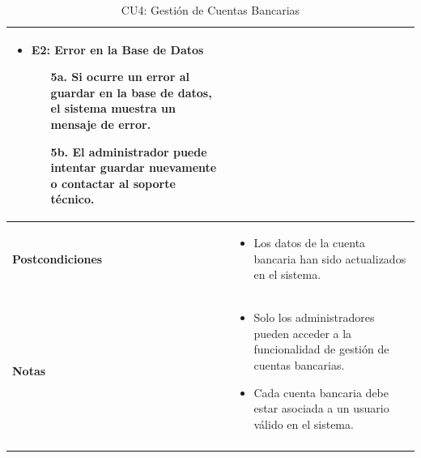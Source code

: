 \documentclass{article}
\begin{document}
\begin{longtable}{|l|p{10cm}|}
\begin{itemize}
    \item \textbf{E2: Error en la Base de Datos}
    \begin{enumerate}
        \item[5a.] Si ocurre un error al guardar en la base de datos, el sistema muestra un mensaje de error.
        \item[5b.] El administrador puede intentar guardar nuevamente o contactar al soporte técnico.
    \end{enumerate}
\end{itemize} \\ \hline
\textbf{Postcondiciones} & 
\begin{itemize}
    \item Los datos de la cuenta bancaria han sido actualizados en el sistema.
\end{itemize} \\ \hline
\textbf{Notas} & 
\begin{itemize}
    \item Solo los administradores pueden acceder a la funcionalidad de gestión de cuentas bancarias.
    \item Cada cuenta bancaria debe estar asociada a un usuario válido en el sistema.
\end{itemize} \\ \hline
\caption{CU4: Gestión de Cuentas Bancarias}
\end{longtable}

\newpage
\end{document}
